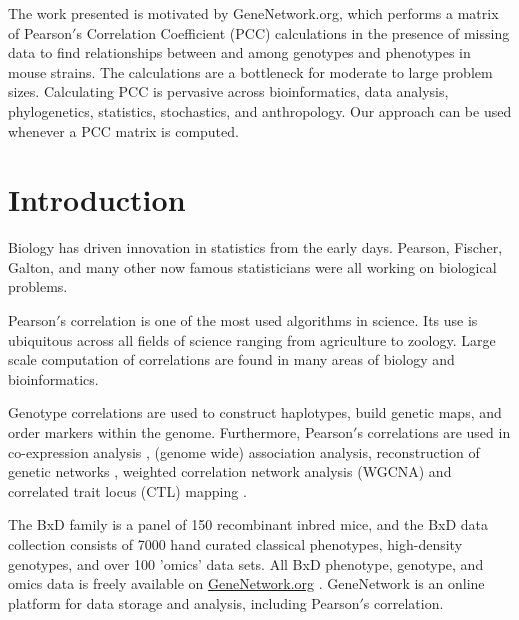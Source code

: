 \documentclass{bioinfo}
\begin{document}
\maketitle

The work presented is motivated by GeneNetwork.org, which performs a
matrix of Pearson$'$s Correlation Coefficient (PCC) calculations in
the presence of missing data to find relationships between and among
genotypes and phenotypes in mouse strains. The calculations are a
bottleneck for moderate to large problem sizes. Calculating PCC is
pervasive across bioinformatics, data analysis, phylogenetics,
statistics, stochastics, and anthropology. Our approach can be used
whenever a PCC matrix is computed.

\section{Introduction}
Biology has driven innovation in statistics from the early days. Pearson, Fischer,
Galton, and many other now famous statisticians were all working on biological
problems.

\enlargethispage{12pt}

Pearson$'$s correlation is one of the most used algorithms in science. Its use is
ubiquitous across all fields of science ranging from agriculture to zoology. Large
scale computation of correlations are found in many areas of biology and
bioinformatics.

Genotype correlations are used to construct haplotypes, build genetic maps, and
order markers within the genome. Furthermore, Pearson$'$s correlations are used in
co-expression analysis \citep{Tesson:2010}, (genome wide) association analysis,
reconstruction of genetic networks \citep{Fukushima:2013}, weighted correlation
network analysis (WGCNA) \citep{Horvath:2008} and correlated trait locus (CTL)
mapping \citep{Arends2016a}.

The BxD family is a panel of 150 recombinant inbred mice, and the BxD data collection
consists of 7000 hand curated classical phenotypes, high-density genotypes, and over
100 'omics' data sets. All BxD phenotype, genotype, and omics data is freely available on
\href{https://genenetwork.org/}{GeneNetwork.org} \citep{Sloan2016}. GeneNetwork is an
online platform for data storage and analysis, including Pearson$'$s correlation.
\end{document}
